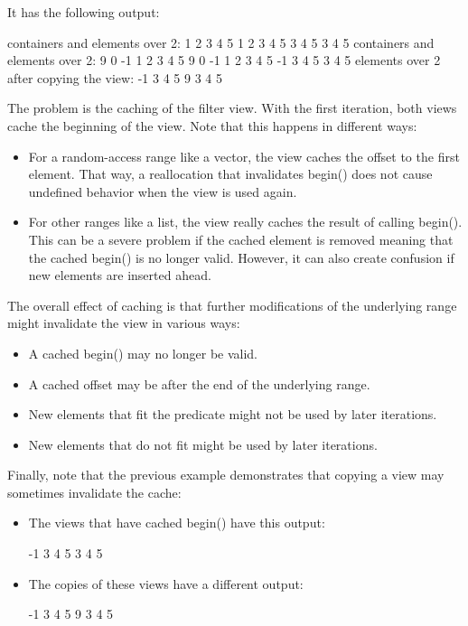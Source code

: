 It has the following output:

{\footnotesize
\begin{shell}
containers and elements over 2:
1 2 3 4 5
1 2 3 4 5
3 4 5
3 4 5
containers and elements over 2:
9 0 -1 1 2 3 4 5
9 0 -1 1 2 3 4 5
-1 3 4 5
3 4 5
elements over 2 after copying the view:
-1 3 4 5
9 3 4 5
\end{shell}
}

The problem is the caching of the filter view. With the first iteration, both views cache the beginning of the view. Note that this happens in different ways:

\begin{itemize}
\item
For a random-access range like a vector, the view caches the offset to the first element. That way, a reallocation that invalidates begin() does not cause undefined behavior when the view is used again.

\item
For other ranges like a list, the view really caches the result of calling begin(). This can be a severe problem if the cached element is removed meaning that the cached begin() is no longer valid. However, it can also create confusion if new elements are inserted ahead.
\end{itemize}

The overall effect of caching is that further modifications of the underlying range might invalidate the view in various ways:

\begin{itemize}
\item
A cached begin() may no longer be valid.

\item
A cached offset may be after the end of the underlying range.

\item
New elements that fit the predicate might not be used by later iterations.

\item
New elements that do not fit might be used by later iterations.
\end{itemize}


Finally, note that the previous example demonstrates that copying a view may sometimes invalidate the cache:

\begin{itemize}
\item
The views that have cached begin() have this output:

{\footnotesize
\begin{shell}
-1 3 4 5
3 4 5
\end{shell}
}

\item
The copies of these views have a different output:

{\footnotesize
\begin{shell}
-1 3 4 5
9 3 4 5
\end{shell}
}
\end{itemize}

